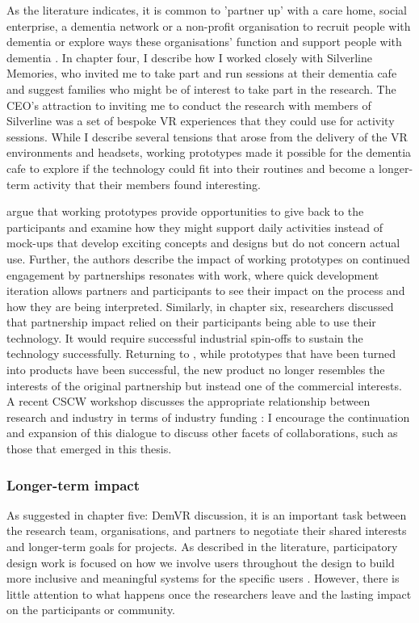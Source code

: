 As the literature indicates, it is common to 'partner up' with a care home, social enterprise, a dementia network or a non-profit organisation to recruit people with dementia or explore ways these organisations’ function and support people with dementia \citep{bartlett2019strategies}. In chapter four, I describe how I worked closely with Silverline Memories, who invited me to take part and run sessions at their dementia cafe and suggest families who might be of interest to take part in the research. The CEO's attraction to inviting me to conduct the research with members of Silverline was a set of bespoke VR experiences that they could use for activity sessions. While I describe several tensions that arose from the delivery of the VR environments and headsets, working prototypes made it possible for the dementia cafe to explore if the technology could fit into their routines and become a longer-term activity that their members found interesting. 

\cite{bodker2018participatory} argue that working prototypes provide opportunities to give back to the participants and examine how they might support daily activities instead of mock-ups that develop exciting concepts and designs but do not concern actual use. Further, the authors describe the impact of working prototypes on continued engagement by partnerships resonates with \cite{lindsay_empathy_2012} work, where quick development iteration allows partners and participants to see their impact on the process and how they are being interpreted. Similarly, in chapter six, researchers discussed that partnership impact relied on their participants being able to use their technology. It would require successful industrial spin-offs to sustain the technology successfully. Returning to \cite{bodker2018participatory}, while prototypes that have been turned into products have been successful, the new product no longer resembles the interests of the original partnership but instead one of the commercial interests. A recent CSCW workshop discusses the appropriate relationship between research and industry in terms of industry funding \citep{group_patron_2019}: I encourage the continuation and expansion of this dialogue to discuss other facets of collaborations, such as those that emerged in this thesis.

\subsubsection{Longer-term impact}
\label{LongTermImpact}
As suggested in chapter five: DemVR discussion, it is an important task between the research team, organisations, and partners to negotiate their shared interests and longer-term goals for projects. As described in the literature, participatory design work is focused on how we involve users throughout the design to build more inclusive and meaningful systems for the specific users \citep{vines_configuring_2013}. However, there is little attention to what happens once the researchers leave and the lasting impact on the participants or community. 

